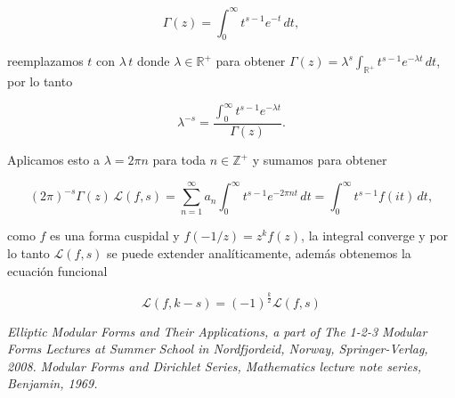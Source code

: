\documentclass[letterpaper]{report}
\newcommand{\dbz}{\ensuremath{ \mathbb Z }}
\newcommand{\re}{\ensuremath{\mathbb R }}
\newcommand{\ga}{\ensuremath{\Gamma}}
\begin{document}
$$\ga(z)=\int_0^{\infty}t^{s-1}e^{-t}\,dt,$$

\noindent reemplazamos $t$ con $\lambda\,t$ donde $\lambda\in\re^{+}$ para obtener $\ga(z)=\lambda^{s}\int_{\re^{+}}t^{s-1}e^{-\lambda t}\,dt$, por lo tanto

$$\lambda^{-s}=\frac{\int_0^{\infty}t^{s-1}e^{-\lambda t}}{\ga(z)}.$$

Aplicamos esto a $\lambda = 2\pi n$ para toda $n\in\dbz^{+}$ y sumamos para obtener

\begin{equation}
(2\pi)^{-s}\ga(z)\,\mathcal{L}(f,s)=
\sum_{n=1}^{\infty}a_n\int_0^{\infty}t^{s-1}e^{-2\pi nt}\,dt=
\int_0^{\infty}t^{s-1}f(it)\,dt,
\end{equation}

\noindent como $f$ es una forma cuspidal y $f(-1/z)=z^k f(z)$, la integral converge y por lo tanto $\mathcal{L}(f,s)$ se puede extender analíticamente, además obtenemos la ecuación funcional

\begin{equation}
\mathcal{L}(f,k-s)=(-1)^{\frac{k}{2}}\mathcal{L}(f,s)
\end{equation}

\begin{thebibliography}{99}

 {\it Elliptic Modular Forms and Their Applications, a part of The 1-2-3 Modular Forms Lectures at Summer School in Nordfjordeid, Norway, Springer-Verlag, 2008.}
 {\it Modular Forms and Dirichlet Series, Mathematics lecture note series, Benjamin,
1969.}

\end{thebibliography}
\end{document}
